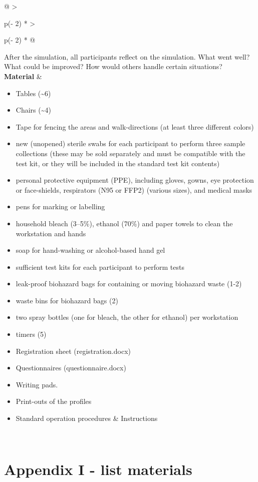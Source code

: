 \documentclass[
]{book}
\begin{document}
\begin{longtable}[]{@{}
  >{\raggedright\arraybackslash}p{(\columnwidth - 2\tabcolsep) * }
  >{\raggedright\arraybackslash}p{(\columnwidth - 2\tabcolsep) * }@{}}
After the simulation, all participants reflect on the
simulation. What went well? What could be improved?
How would others handle certain situations? \\
\textbf{Material} & \begin{minipage}[t]{\linewidth}\raggedright
\begin{itemize}
\item
  Tables (\textasciitilde6)
\item
  Chairs (\textasciitilde4)
\item
  Tape for fencing the areas and walk-directions
  (at least three different colors)
\item
  new (unopened) sterile swabs for each participant
  to perform three sample collections (these may be
  sold separately and must be compatible with the
  test kit, or they will be included in the
  standard test kit contents)
\item
  personal protective equipment (PPE), including
  gloves, gowns, eye protection or face-shields,
  respirators (N95 or FFP2) (various sizes), and
  medical masks
\item
  pens for marking or labelling
\item
  household bleach (3--5\%), ethanol (70\%) and paper
  towels to clean the workstation and hands
\item
  soap for hand-washing or alcohol-based hand gel
\item
  sufficient test kits for each participant to
  perform tests
\item
  leak-proof biohazard bags for containing or
  moving biohazard waste (1-2)
\item
  waste bins for biohazard bags (2)
\item
  two spray bottles (one for bleach, the other for
  ethanol) per workstation
\item
  timers (5)
\item
  Registration sheet (registration.docx)
\item
  Questionnaires (questionnaire.docx)
\item
  Writing pads.
\item
  Print-outs of the profiles
\item
  Standard operation procedures \& Instructions
\end{itemize}
\end{minipage} \\
\bottomrule
\end{longtable}

\hypertarget{appendix-i---list-materials}{%
\chapter*{Appendix I - list materials}\label{appendix-i---list-materials}}
\end{document}
